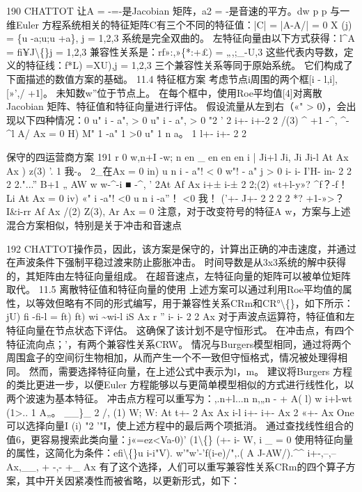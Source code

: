 \documentclass[UTF8,11pt,a4paper,openany,fontset=fandol]{ctexbook}
\begin{document}
190 CHATTOT 让A = -=-是Jacobian 矩阵，a2 = -是音速的平方。dw p p 与一维Euler 方程系统相关的特征矩阵C有三个不同的特征值：|C| = |A-A/| = 0 X (j) = \{u -a;u;u +a\}, j = 1,2,3 系统是完全双曲的。 左特征向量由以下方式获得：l\textasciicircum{}A = fi¥J\textbackslash\{\}j = 1,2,3 兼容性关系是：rf»:,»\{*:+£) = „,;\_-U,3 这些代表内导数，定义的特征线：f*L) =XU),j = 1,2,3 三个兼容性关系等同于原始系统。 它们构成了下面描述的数值方案的基础。 11.4 特征框方案 考虑节点i周围的两个框[i - l,i], [»',/ +1]。 未知数w”位于节点上。 在每个框中，使用Roe平均值[4]对离散Jacobian 矩阵、特征值和特征向量进行评估。 假设流量从左到右（«" > 0），会出现以下四种情况：0 u" i - a", > 0 u" i - a", > 0 "2 ' 2 i+- i+-2 2 /(3) \textasciicircum{} +1 -\textasciicircum{}, \textasciicircum{}-\textasciicircum{}l A/ Ax = 0 H) M" 1 -a" 1 >0 u" 1 n a。 1 l+- i+- 2 2

保守的四运营商方案 191 r 0 w,n+I -w; n en \_ en en en i | Ji+l Ji, Ji Ji-l At Ax Ax ) z(3) '. 1 我-。 2\_在Ax = 0 in) u n i - a"! < 0 w"! - a" j > 0 i- i- I'H- in- 2 2 2 2."...” B+1 „ AW w w-\textasciicircum{}-i ■ -\textasciicircum{}, ' 2At Af Ax i+± i-± 2 2;(2) «t+l-y»? \textasciicircum{}f？-f！ Li At Ax = 0 iv) «" i -a"! <0 u n i -a”！ <0 我！ ('+- J+- 2 2 2 2 *? +1-»>？ I\&i-rr Af Ax /(2) Z(3), Ar Ax = 0 注意，对于改变符号的特征A w，方案与上述混合方案相似，特别是关于冲击和音速点

192 CHATTOT操作员，因此，该方案是保守的，计算出正确的冲击速度，并通过在声波条件下强制平稳过渡来防止膨胀冲击。 时间导数是从3x3系统的解中获得的，其矩阵由左特征向量组成。 在超音速点，左特征向量的矩阵可以被单位矩阵取代。 11.5 离散特征值和特征向量的使用 上述方案可以通过利用Roe平均值的属性，以等效但略有不同的形式编写，用于兼容性关系CRm和CR°\textbackslash\{\}，如下所示：jU) fi -fi-l = ft) ft) wi \textasciitilde{}wi-l iS Ax r '' i- i- 2 2 Ax 对于声波点运算符，特征值和左特征向量在节点状态下评估。 这确保了该计划不是守恒形式。 在冲击点，有四个特征流向点；'，有两个兼容性关系CRW。 情况与Burgers模型相同，通过将两个周围盒子的空间衍生物相加，从而产生一个不一致但守恒格式，情况被处理得相同。 然而，需要选择特征向量，在上述公式中表示为l，m。 建议将Burgers 方程的类比更进一步，以便Euler 方程能够以与更简单模型相似的方式进行线性化，以两个波速为基本特征。 冲击点方程可以重写为：,.n+l...n n,„n - + A( l) w i+l-wt (1>.. 1 A„。 \_\_\}\_ 2 /, (1) W; W: At t+- 2 Ax Ax i-l i+- i+- Ax 2 «+- Ax One可以选择向量I (i) "2 '"I，使上述方程中的最后两个项抵消。 通过查找线性组合的值6，更容易搜索此类向量：j«=ez<Va-0)' (1\textbackslash\{\} (+- i- W, i \_ = 0 使用特征向量的属性，这简化为条件：efi\textbackslash\{\}u i-i"V). w'"w'-'f(i-e)/",.( A J-AW/).\textasciicircum{}\textasciicircum{} i+-,--,-- Ax,\_\_, + -,- +\_ Ax 有了这个选择，人们可以重写兼容性关系CRm的四个算子方案，其中开关因紧凑性而被省略，以更新形式，如下：
\end{document}
